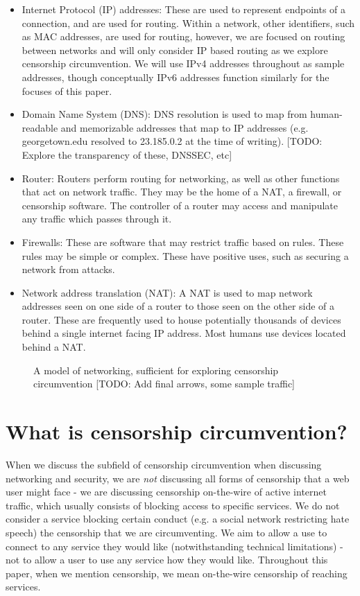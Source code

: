 \documentclass[12pt]{report}
\begin{document}
\begin{itemize}
  \item Internet Protocol (IP) addresses: These are used to represent endpoints of a connection, and are used for routing. Within a network, other identifiers, such as MAC addresses, are used for routing, however, we are focused on routing between networks and will only consider IP based routing as we explore censorship circumvention. We will use IPv4 addresses throughout as sample addresses, though conceptually IPv6 addresses function similarly for the focuses of this paper.
  \item Domain Name System (DNS): DNS resolution is used to map from human-readable and memorizable addresses that map to IP addresses (e.g. georgetown.edu resolved to 23.185.0.2 at the time of writing). [TODO: Explore the transparency of these, DNSSEC, etc]
  \item Router: Routers perform routing for networking, as well as other functions that act on network traffic. They may be the home of a NAT, a firewall, or censorship software. The controller of a router may access and manipulate any traffic which passes through it.
  \item Firewalls: These are software that may restrict traffic based on rules. These rules may be simple or complex. These have positive uses, such as securing a network from attacks.
  \item Network address translation (NAT): A NAT is used to map network addresses seen on one side of a router to those seen on the other side of a router. These are frequently used to house potentially thousands of devices behind a single internet facing IP address. Most humans use devices located behind a NAT.
\end{itemize}

\begin{figure}
\begin{center}
{}
\end{center}
\caption{A model of networking, sufficient for exploring censorship circumvention [TODO: Add final arrows, some sample traffic]}
\end{figure}

\section{What is censorship circumvention?}

When we discuss the subfield of censorship circumvention when discussing networking and security, we are \emph{not} discussing all forms of censorship that a web user might face - we are discussing censorship on-the-wire of active internet traffic, which usually consists of blocking access to specific services. We do not consider a service blocking certain conduct (e.g. a social network restricting hate speech) the censorship that we are circumventing. We aim to allow a use to connect to any service they would like (notwithstanding technical limitations) - not to allow a user to use any service how they would like. Throughout this paper, when we mention censorship, we mean on-the-wire censorship of reaching services.
\end{document}

